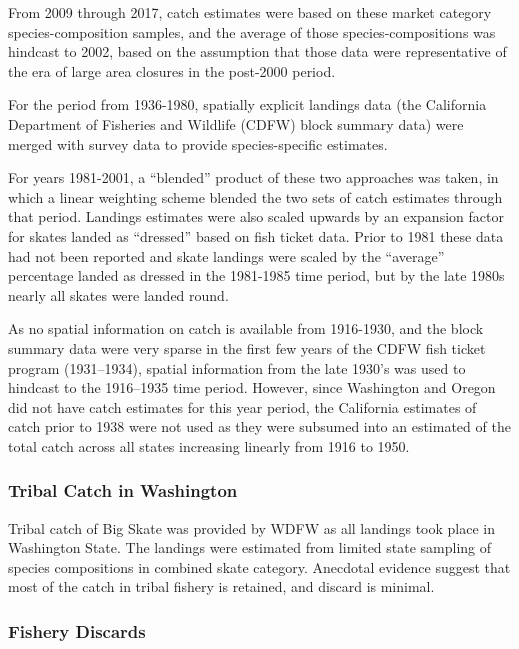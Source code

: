 \documentclass[12pt,]{article}
\begin{document}
From 2009 through 2017, catch estimates were based on these market
category species-composition samples, and the average of those
species-compositions was hindcast to 2002, based on the assumption that
those data were representative of the era of large area closures in the
post-2000 period.

For the period from 1936-1980, spatially explicit landings data (the
California Department of Fisheries and Wildlife (CDFW) block summary
data) were merged with survey data to provide species-specific
estimates.

For years 1981-2001, a ``blended'' product of these two approaches was
taken, in which a linear weighting scheme blended the two sets of catch
estimates through that period. Landings estimates were also scaled
upwards by an expansion factor for skates landed as ``dressed'' based on
fish ticket data. Prior to 1981 these data had not been reported and
skate landings were scaled by the ``average'' percentage landed as
dressed in the 1981-1985 time period, but by the late 1980s nearly all
skates were landed round.

As no spatial information on catch is available from 1916-1930, and the
block summary data were very sparse in the first few years of the CDFW
fish ticket program (1931--1934), spatial information from the late
1930's was used to hindcast to the 1916--1935 time period. However,
since Washington and Oregon did not have catch estimates for this year
period, the California estimates of catch prior to 1938 were not used as
they were subsumed into an estimated of the total catch across all
states increasing linearly from 1916 to 1950.

\hypertarget{tribal-catch-in-washington}{%
\subsubsection{Tribal Catch in
Washington}\label{tribal-catch-in-washington}}

Tribal catch of Big Skate was provided by WDFW as all landings took
place in Washington State. The landings were estimated from limited
state sampling of species compositions in combined skate category.
Anecdotal evidence suggest that most of the catch in tribal fishery is
retained, and discard is minimal.

\hypertarget{fishery-discards}{%
\subsubsection{Fishery Discards}\label{fishery-discards}}
\end{document}
